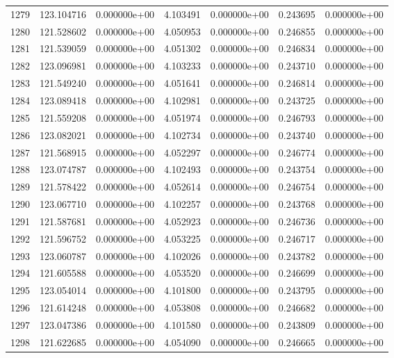\begin{tabular}{rrrrrrr}
1279 & 123.104716 &  0.000000e+00 &  4.103491 &  0.000000e+00 &    0.243695 &  0.000000e+00 \\
1280 & 121.528602 &  0.000000e+00 &  4.050953 &  0.000000e+00 &    0.246855 &  0.000000e+00 \\
1281 & 121.539059 &  0.000000e+00 &  4.051302 &  0.000000e+00 &    0.246834 &  0.000000e+00 \\
1282 & 123.096981 &  0.000000e+00 &  4.103233 &  0.000000e+00 &    0.243710 &  0.000000e+00 \\
1283 & 121.549240 &  0.000000e+00 &  4.051641 &  0.000000e+00 &    0.246814 &  0.000000e+00 \\
1284 & 123.089418 &  0.000000e+00 &  4.102981 &  0.000000e+00 &    0.243725 &  0.000000e+00 \\
1285 & 121.559208 &  0.000000e+00 &  4.051974 &  0.000000e+00 &    0.246793 &  0.000000e+00 \\
1286 & 123.082021 &  0.000000e+00 &  4.102734 &  0.000000e+00 &    0.243740 &  0.000000e+00 \\
1287 & 121.568915 &  0.000000e+00 &  4.052297 &  0.000000e+00 &    0.246774 &  0.000000e+00 \\
1288 & 123.074787 &  0.000000e+00 &  4.102493 &  0.000000e+00 &    0.243754 &  0.000000e+00 \\
1289 & 121.578422 &  0.000000e+00 &  4.052614 &  0.000000e+00 &    0.246754 &  0.000000e+00 \\
1290 & 123.067710 &  0.000000e+00 &  4.102257 &  0.000000e+00 &    0.243768 &  0.000000e+00 \\
1291 & 121.587681 &  0.000000e+00 &  4.052923 &  0.000000e+00 &    0.246736 &  0.000000e+00 \\
1292 & 121.596752 &  0.000000e+00 &  4.053225 &  0.000000e+00 &    0.246717 &  0.000000e+00 \\
1293 & 123.060787 &  0.000000e+00 &  4.102026 &  0.000000e+00 &    0.243782 &  0.000000e+00 \\
1294 & 121.605588 &  0.000000e+00 &  4.053520 &  0.000000e+00 &    0.246699 &  0.000000e+00 \\
1295 & 123.054014 &  0.000000e+00 &  4.101800 &  0.000000e+00 &    0.243795 &  0.000000e+00 \\
1296 & 121.614248 &  0.000000e+00 &  4.053808 &  0.000000e+00 &    0.246682 &  0.000000e+00 \\
1297 & 123.047386 &  0.000000e+00 &  4.101580 &  0.000000e+00 &    0.243809 &  0.000000e+00 \\
1298 & 121.622685 &  0.000000e+00 &  4.054090 &  0.000000e+00 &    0.246665 &  0.000000e+00 \\

\end{tabular}
